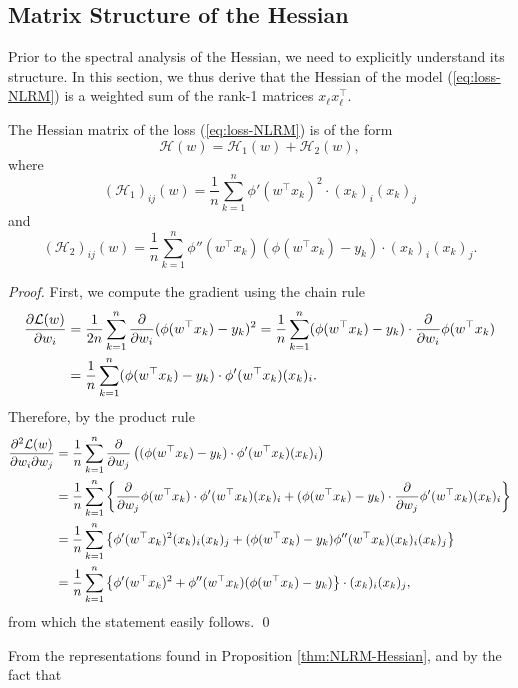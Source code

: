 \documentclass{article}
\begin{document}
\subsection{Matrix Structure of the Hessian}
Prior to the spectral analysis of the Hessian, we need to explicitly understand its structure. In this section, we thus derive that the Hessian of the model (\ref{eq:loss-NLRM}) is a weighted sum of the rank-1 matrices $x_\ell x_\ell^\top$.
\bigskip
\begin{proposition}\label{thm:NLRM-Hessian}
The Hessian matrix of the loss (\ref{eq:loss-NLRM}) is of the form
$$\mathcal{H}(w)=\mathcal{H}_1(w)+\mathcal{H}_2(w),$$
where
$$(\mathcal{H}_1)_{ij}(w)=\frac{1}{n}\sum_{k=1}^n\phi'(w^\top x_k)^2\cdot(x_k)_i(x_k)_j$$
and
$$(\mathcal{H}_2)_{ij}(w)=\frac{1}{n}\sum_{k=1}^n\phi''(w^\top x_k)(\phi(w^\top x_k)-y_k)\cdot(x_k)_i(x_k)_j.$$
\end{proposition}
\smallskip
\noindent
\emph{Proof.} First, we compute the gradient using the chain rule
\begin{align}
\frac{\partial\mathcal{L}(w)}{\partial w_i} &= \frac{1}{2n}\sum_{k=1}^n\frac{\partial}{\partial w_i}(\phi(w^\top x_k)-y_k)^2 = \frac{1}{n}\sum_{k=1}^n(\phi(w^\top x_k)-y_k)\cdot\frac{\partial}{\partial w_i}\phi(w^\top x_k) \notag
\\ &= \frac{1}{n}\sum_{k=1}^n(\phi(w^\top x_k)-y_k)\cdot\phi'(w^\top x_k)(x_k)_i.
\end{align}
Therefore, by the product rule
\begin{align}
\frac{\partial^2\mathcal{L}(w)}{\partial w_i\partial w_j} &= \frac{1}{n}\sum_{k=1}^n\frac{\partial}{\partial w_j}\left((\phi(w^\top x_k)-y_k)\cdot\phi'(w^\top x_k)(x_k)_i\right) \notag
\\ &= \frac{1}{n}\sum_{k=1}^n\left\{\frac{\partial}{\partial w_j}\phi(w^\top x_k)\cdot\phi'(w^\top x_k)(x_k)_i+(\phi(w^\top x_k)-y_k)\cdot\frac{\partial}{\partial w_j}\phi'(w^\top x_k)(x_k)_i\right\} \notag
\\ &= \frac{1}{n}\sum_{k=1}^n\left\{\phi'(w^\top x_k)^2(x_k)_i(x_k)_j+(\phi(w^\top x_k)-y_k)\phi''(w^\top x_k)(x_k)_i(x_k)_j \right\} \notag
\\ &= \frac{1}{n}\sum_{k=1}^n\left\{\phi'(w^\top x_k)^2+\phi''(w^\top x_k)(\phi(w^\top x_k)-y_k)\right\}\cdot(x_k)_i(x_k)_j,
\end{align}
from which the statement easily follows.
\qed
\bigskip
\par
From the representations found in Proposition \ref{thm:NLRM-Hessian}, and by the fact that
\end{document}
